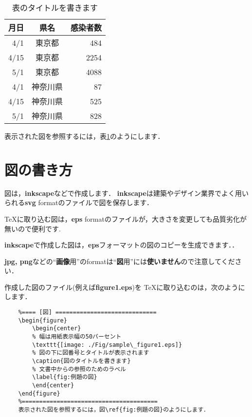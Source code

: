 \documentclass[12pt,a4j,dvipdfmx]{jarticle}
\begin{document}
\begin{table}[h]
    \begin{shadebox}
        \begin{center}
            \caption{表のタイトルを書きます}
            \label{tbl:例題の表}
            \begin{tabular}{r|c|r}
            \hline 
            月日 & 県名 & 感染者数 \\
            \hline 
            4/1 & 東京都 & 484 \\
            4/15& 東京都 & 2254 \\
            5/1 & 東京都 & 4088 \\
            \hline 
            4/1 & 神奈川県 & 87 \\
            4/15 & 神奈川県 & 525 \\
            5/1 & 神奈川県 & 828 \\
            \hline 
            \end{tabular}
        \end{center}
        \vspace{5mm}
        \mbox{表示された図を参照するには，表\ref{tbl:例題の表}のようにします．}
    \end{shadebox}
\end{table}

\newpage
\section{図の書き方}
図は，{\bf inkscape}などで作成します．
{\bf inkscape}は建築やデザイン業界でよく用いられる{\bf svg} formatのファイルで図を保存します．

\TeX に取り込む図は，{\bf eps} formatのファイルが，大きさを変更しても品質劣化が無いので便利です.

{\bf inkscape}で作成した図は，{\bf eps}フォーマットの図のコピーを生成できます．．

{\bf jpg, png}などの``{\bf 画像}用''のformatは``{\bf 図}用''には{\bf 使いません}ので注意してください．

作成した図のファイル(例えば{\bf figure1.eps})を \TeX に取り込むのは，次のようにします．

\begin{shadebox}
{\small
\begin{verbatim}
    %==== [図] =============================
    \begin{figure}
        \begin{center}
        % 幅は用紙表示幅の50パーセント
        \texttt{[image: ./Fig/sample\_figure1.eps]}
        % 図の下に図番号とタイトルが表示されます
        \caption{図のタイトルを書きます}
        % 文書中からの参照のためのラベル
        \label{fig:例題の図}
        \end{center}
    \end{figure}
    %=======================================
    表示された図を参照するには，図\ref{fig:例題の図}のようにします．
\end{verbatim}
}
\end{shadebox}
\end{document}
